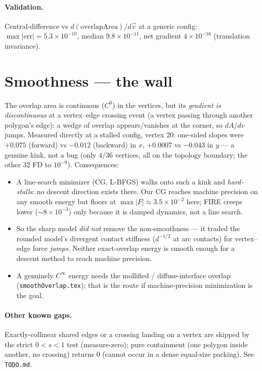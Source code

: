 \documentclass[11pt]{article}
\newcommand{\vv}[1]{\vec{#1}}
\newcommand{\code}[1]{\texttt{#1}}
\begin{document}
\paragraph{Validation.} Central-difference vs $d(\text{overlapArea})/d\vv v$ at a generic config:
$\max|\text{err}|=5.3\times10^{-10}$, median $9.8\times10^{-11}$, net gradient
$4\times10^{-16}$ (translation invariance).

\section{Smoothness --- the wall}

The overlap area is continuous ($C^0$) in the vertices, but its \emph{gradient is discontinuous} at
a vertex--edge crossing event (a vertex passing through another polygon's edge): a wedge of overlap
appears/vanishes at the corner, so $dA/dv$ jumps. Measured directly at a stalled config, vertex $20$:
one-sided slopes were $+0.075$ (forward) vs $-0.012$ (backward) in $x$, $+0.0007$ vs $-0.043$ in $y$
--- a genuine kink, not a bug (only $4/36$ vertices, all on the topology boundary; the other $32$ FD
to $10^{-9}$). Consequences:
\begin{itemize}[leftmargin=1.5em]
\item A line-search minimizer (CG, L-BFGS) walks onto such a kink and \emph{hard-stalls}: no descent
direction exists there. Our CG reaches machine precision on any smooth energy but floors at
$\max|F|\approx3.5\times10^{-2}$ here; FIRE creeps lower ($\sim8\times10^{-3}$) only because it is
damped dynamics, not a line search.
\item So the sharp model \emph{did not} remove the non-smoothness --- it traded the rounded model's
divergent contact stiffness ($d^{-1/2}$ at arc contacts) for vertex--edge force \emph{jumps}. Neither
exact-overlap energy is smooth enough for a descent method to reach machine precision.
\item A genuinely $C^\infty$ energy needs the mollified / diffuse-interface overlap
(\code{smoothOverlap.tex}); that is the route if machine-precision minimization is the goal.
\end{itemize}

\paragraph{Other known gaps.} Exactly-collinear shared edges or a crossing landing on a vertex are
skipped by the strict $0<s<1$ test (measure-zero); pure containment (one polygon inside another, no
crossing) returns $0$ (cannot occur in a dense equal-size packing). See \code{TODO.md}.
\end{document}
